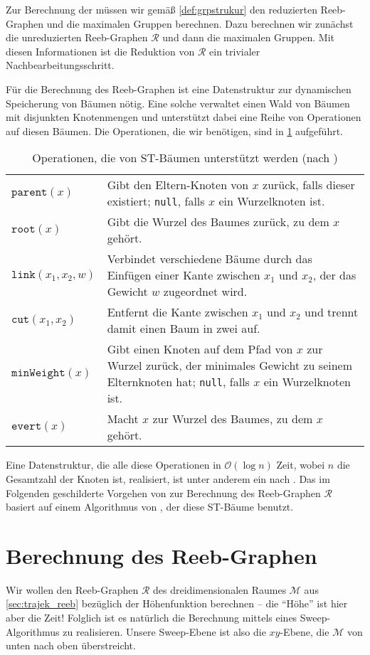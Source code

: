 Zur Berechnung der \GrpStruktur müssen wir gemäß \cref{def:grpstrukur} den reduzierten Reeb-Graphen und die maximalen Gruppen berechnen.
Dazu berechnen wir zunächst die unreduzierten Reeb-Graphen $\mathcal{R}$ und dann die maximalen Gruppen. 
Mit diesen Informationen ist die Reduktion von $\mathcal{R}$ ein trivialer Nachbearbeitungsschritt.

Für die Berechnung des Reeb-Graphen ist eine Datenstruktur zur dynamischen Speicherung von Bäumen nötig.
Eine solche verwaltet einen Wald von Bäumen mit disjunkten Knotenmengen und unterstützt dabei eine Reihe von Operationen auf diesen Bäumen.
Die Operationen, die wir benötigen, sind in \cref{tbl:operationenST} aufgeführt.
\begin{table}[hbtp]
	\Centering
	\caption{Operationen, die von ST-Bäumen unterstützt werden (nach \cite{parsaReeb})}\label{tbl:operationenST}
	\begin{tabular}{lp{}}
		\toprule
		$\mathtt{parent}(x)$ & Gibt den Eltern-Knoten von $x$ zurück, falls dieser existiert; \texttt{null}, falls $x$ ein Wurzelknoten ist.\\
		$\mathtt{root}(x)$ & Gibt die Wurzel des Baumes zurück, zu dem $x$ gehört.\\
		$\mathtt{link}(x_1,x_2,w)$ & Verbindet verschiedene Bäume durch das Einfügen einer Kante zwischen $x_1$ und $x_2$, der das Gewicht $w$ zugeordnet wird.\\
		$\mathtt{cut}(x_1,x_2)$ & Entfernt die Kante zwischen $x_1$ und $x_2$ und trennt damit einen Baum in zwei auf.\\
		$\mathtt{minWeight}(x)$ & Gibt einen Knoten auf dem Pfad von $x$ zur Wurzel zurück, der minimales Gewicht zu seinem Elternknoten hat; \texttt{null}, falls $x$ ein Wurzelknoten ist.\\
		$\mathtt{evert}(x)$ & Macht $x$ zur Wurzel des Baumes, zu dem $x$ gehört.\\
		\bottomrule
	\end{tabular}
\end{table}
Eine Datenstruktur, die alle diese Operationen in $\mathcal{O}(\log n)$ Zeit, wobei $n$ die Gesamtzahl der Knoten ist, realisiert, ist unter anderem ein  nach \textcite{dynamictrees}.
Das im Folgenden geschilderte Vorgehen von \textcite{buchin2015} zur Berechnung des Reeb-Graphen $\mathcal{R}$ basiert auf einem Algorithmus von \textcite{parsaReeb}, der diese ST-Bäume benutzt.

\section{Berechnung des Reeb-Graphen} %
\label{sec:berechnung_reeb}
Wir wollen den Reeb-Graphen $\mathcal{R}$ des dreidimensionalen Raumes $\mathcal{M}$ aus \cref{sec:trajek_reeb} bezüglich der Höhenfunktion berechnen -- die \enquote{Höhe} ist hier aber die Zeit! 
Folglich ist es natürlich die Berechnung mittels eines Sweep-Algorithmus zu realisieren.
Unsere Sweep-Ebene ist also die $xy$-Ebene, die $\mathcal{M}$ von unten nach oben überstreicht.

